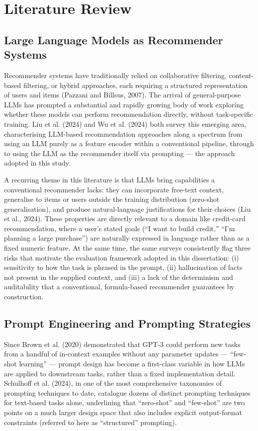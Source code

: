 \chapter{Literature Review}
\label{ch:litreview}

\section{Large Language Models as Recommender Systems}

Recommender systems have traditionally relied on collaborative filtering, content-based filtering, or hybrid approaches, each requiring a structured representation of users and items (Pazzani and Billsus, 2007). The arrival of general-purpose LLMs has prompted a substantial and rapidly growing body of work exploring whether these models can perform recommendation directly, without task-specific training. Liu et al. (2024) and Wu et al. (2024) both survey this emerging area, characterising LLM-based recommendation approaches along a spectrum from using an LLM purely as a feature encoder within a conventional pipeline, through to using the LLM as the recommender itself via prompting --- the approach adopted in this study.

A recurring theme in this literature is that LLMs bring capabilities a conventional recommender lacks: they can incorporate free-text context, generalise to items or users outside the training distribution (zero-shot generalisation), and produce natural-language justifications for their choices (Liu et al., 2024). These properties are directly relevant to a domain like credit-card recommendation, where a user's stated goals (``I want to build credit,'' ``I'm planning a large purchase'') are naturally expressed in language rather than as a fixed numeric feature. At the same time, the same surveys consistently flag three risks that motivate the evaluation framework adopted in this dissertation: (i) sensitivity to how the task is phrased in the prompt, (ii) hallucination of facts not present in the supplied context, and (iii) a lack of the determinism and auditability that a conventional, formula-based recommender guarantees by construction.

\section{Prompt Engineering and Prompting Strategies}

Since Brown et al. (2020) demonstrated that GPT-3 could perform new tasks from a handful of in-context examples without any parameter updates --- ``few-shot learning'' --- prompt design has become a first-class variable in how LLMs are applied to downstream tasks, rather than a fixed implementation detail. Schulhoff et al. (2024), in one of the most comprehensive taxonomies of prompting techniques to date, catalogue dozens of distinct prompting techniques for text-based tasks alone, underlining that ``zero-shot'' and ``few-shot'' are two points on a much larger design space that also includes explicit output-format constraints (referred to here as ``structured'' prompting).

